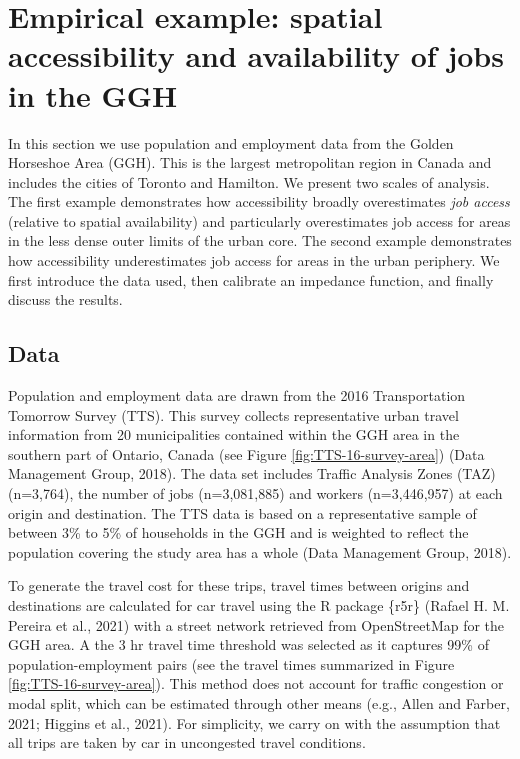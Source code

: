 \documentclass[]{elsarticle} %
\begin{document}
\hypertarget{empirical-example-spatial-accessibility-and-availability-of-jobs-in-the-ggh}{%
\section{Empirical example: spatial accessibility and availability of
jobs in the
GGH}\label{empirical-example-spatial-accessibility-and-availability-of-jobs-in-the-ggh}}

In this section we use population and employment data from the Golden
Horseshoe Area (GGH). This is the largest metropolitan region in Canada
and includes the cities of Toronto and Hamilton. We present two scales
of analysis. The first example demonstrates how accessibility broadly
overestimates \emph{job access} (relative to spatial availability) and
particularly overestimates job access for areas in the less dense outer
limits of the urban core. The second example demonstrates how
accessibility underestimates job access for areas in the urban
periphery. We first introduce the data used, then calibrate an impedance
function, and finally discuss the results.

\hypertarget{data}{%
\subsection{Data}\label{data}}

Population and employment data are drawn from the 2016 Transportation
Tomorrow Survey (TTS). This survey collects representative urban travel
information from 20 municipalities contained within the GGH area in the
southern part of Ontario, Canada (see Figure
\ref{fig:TTS-16-survey-area}) (Data Management Group, 2018). The data
set includes Traffic Analysis Zones (TAZ) (n=3,764), the number of jobs
(n=3,081,885) and workers (n=3,446,957) at each origin and destination.
The TTS data is based on a representative sample of between 3\% to 5\%
of households in the GGH and is weighted to reflect the population
covering the study area has a whole (Data Management Group, 2018).

To generate the travel cost for these trips, travel times between
origins and destinations are calculated for car travel using the R
package \{r5r\} (Rafael H. M. Pereira et al., 2021) with a street
network retrieved from OpenStreetMap for the GGH area. A the 3 hr travel
time threshold was selected as it captures 99\% of population-employment
pairs (see the travel times summarized in Figure
\ref{fig:TTS-16-survey-area}). This method does not account for traffic
congestion or modal split, which can be estimated through other means
(e.g., Allen and Farber, 2021; Higgins et al., 2021). For simplicity, we
carry on with the assumption that all trips are taken by car in
uncongested travel conditions.
\end{document}
